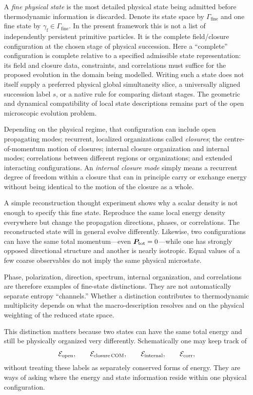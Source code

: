 \documentclass[11pt]{article}
\theoremstyle{definition}
\newcommand{\GammaFine}{\Gamma_{\mathrm{fine}}}
\begin{document}
A \emph{fine physical state} is the most detailed physical state being admitted before
thermodynamic information is discarded.  Denote its state space by $\GammaFine$ and one
fine state by $\gamma_{\mathrm f}\in\GammaFine$.  In the present framework this is not a
list of independently persistent primitive particles.  It is the complete field/closure
configuration at the chosen stage of physical succession.  Here a ``complete''
configuration is complete relative to a specified admissible state representation:
its field and closure data, constraints, and correlations must suffice for the
proposed evolution in the domain being modelled.  Writing such a state does not
itself supply a preferred physical global simultaneity slice, a universally
aligned succession label $s$, or a native rule for comparing distant stages.
The geometric and dynamical compatibility of local state descriptions remains
part of the open microscopic evolution problem.

Depending on the physical regime, that configuration can include open propagating
modes; recurrent, localized organizations called \emph{closures}; the centre-of-momentum
motion of closures; internal closure organization and internal modes; correlations
between different regions or organizations; and extended interacting configurations.
An \emph{internal closure mode} simply means a recurrent degree of freedom within a
closure that can in principle carry or exchange energy without being identical to the
motion of the closure as a whole.

A simple reconstruction thought experiment shows why a scalar density is not enough to
specify this fine state.  Reproduce the same local energy density everywhere but change the
propagation directions, phases, or correlations.  The reconstructed state will in general
evolve differently.  Likewise, two configurations can have the same total momentum---even
$\bm P_{\rm tot}=0$---while one has strongly opposed directional structure and another is
nearly isotropic.  Equal values of a few coarse observables do not imply the same physical
microstate.

Phase, polarization, direction, spectrum, internal organization, and correlations are
therefore examples of fine-state distinctions.  They are not automatically separate entropy
``channels.''  Whether a distinction contributes to thermodynamic multiplicity depends on
what the macro-description resolves and on the physical weighting of the reduced state space.

This distinction matters because two states can have the same total energy and still be
physically organized very differently.  Schematically one may keep track of
\begin{equation}
  \mathcal E_{\rm open},\qquad
  \mathcal E_{\rm closure\,COM},\qquad
  \mathcal E_{\rm internal},\qquad
  \mathcal E_{\rm corr},
  \label{eq:organizational-ledger}
\end{equation}
without treating these labels as separately conserved forms of energy.  They are ways of
asking where the energy and state information reside within one physical configuration.
\end{document}
